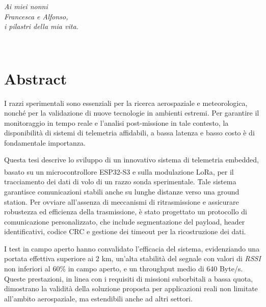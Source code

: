 \documentclass[12pt,a4paper,twoside]{book}
\begin{document}

\ifdefined\HCode
\else
    \topmargin=5.5cm
    \begin{flushright}
        \emph{
            \LARGE{Ai miei nonni}\\\vspace{3mm}
            \LARGE{Francesca e Alfonso,}\\\vspace{3mm}
            \LARGE{i pilastri della mia vita.}\\\vspace{3mm}
        }
    \end{flushright}
\fi
\newpage~\newpage
{}
\chapter*{Abstract}
I razzi sperimentali sono essenziali per la ricerca aerospaziale e meteorologica,
nonché per la validazione di nuove tecnologie in ambienti estremi.
Per garantire il monitoraggio in tempo reale e l'analisi post-missione in tale
contesto, la disponibilità di sistemi di telemetria affidabili, a bassa latenza
e basso costo è di fondamentale importanza.

Questa tesi descrive lo sviluppo di un innovativo sistema di telemetria embedded,
basato su un microcontrollore ESP32-S3 e sulla modulazione LoRa\textsuperscript{\textcopyright},
per il tracciamento dei dati di volo di un razzo sonda sperimentale. Tale sistema
garantisce comunicazioni stabili anche su lunghe distanze verso una ground station.
Per ovviare all'assenza di meccanismi di ritrasmissione e assicurare robustezza
ed efficienza della trasmissione, è stato progettato un protocollo di comunicazione
personalizzato, che include segmentazione del payload, header identificativi,
codice CRC e gestione dei timeout per la ricostruzione dei dati.

I test in campo aperto hanno convalidato l'efficacia del sistema, evidenziando una
portata effettiva superiore ai 2 km, un'alta stabilità del segnale con valori di 
\emph{RSSI} non inferiori al 60\% in campo aperto, e un throughput medio di 640 Byte/s. 
Queste prestazioni, in linea con i requisiti di missioni suborbitali a bassa 
quota, dimostrano la validità della soluzione proposta per applicazioni reali non 
limitate all'ambito aerospaziale, ma estendibili anche ad altri settori.
\end{document}
